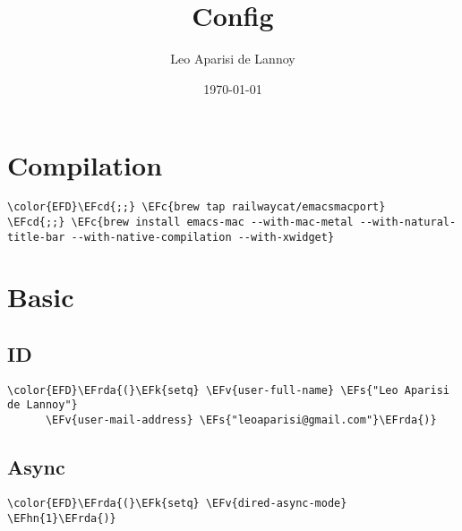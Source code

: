 \documentclass[12pt]{article}
\author{Leo Aparisi de Lannoy}
\date{\today}
\title{Config}
\theoremstyle{plain}%
\theoremstyle{definition}
\theoremstyle{remark}
\newcommand{\EFc}[1]{\textcolor{EFc}{#1}} %
\newcommand{\EFcd}[1]{\textcolor{EFcd}{#1}} %
\newcommand{\EFs}[1]{\textcolor{EFs}{#1}} %
\newcommand{\EFk}[1]{\textcolor{EFk}{#1}} %
\newcommand{\EFv}[1]{\textcolor{EFv}{#1}} %
\newcommand{\EFhn}[1]{\textcolor{EFhn}{\textbf{#1}}} %
\newcommand{\EFrda}[1]{\textcolor{EFrda}{#1}} %
\begin{document}
\maketitle
\tableofcontents

\section{Compilation}
\label{sec:org48b2843}
\begin{Code}
\begin{Verbatim}
\color{EFD}\EFcd{;;} \EFc{brew tap railwaycat/emacsmacport}
\EFcd{;;} \EFc{brew install emacs-mac --with-mac-metal --with-natural-title-bar --with-native-compilation --with-xwidget}
\end{Verbatim}
\end{Code}
\section{Basic}
\label{sec:org0cad0b3}
\subsection{ID}
\label{sec:orgd51a656}
\begin{Code}
\begin{Verbatim}
\color{EFD}\EFrda{(}\EFk{setq} \EFv{user-full-name} \EFs{"Leo Aparisi de Lannoy"}
      \EFv{user-mail-address} \EFs{"leoaparisi@gmail.com"}\EFrda{)}
\end{Verbatim}
\end{Code}
\subsection{Async}
\label{sec:org8efaece}
\begin{Code}
\begin{Verbatim}
\color{EFD}\EFrda{(}\EFk{setq} \EFv{dired-async-mode} \EFhn{1}\EFrda{)}
\end{Verbatim}
\end{Code}
\end{document}
